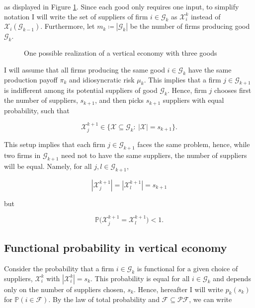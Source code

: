 \documentclass[american, abstract=on]{scrartcl}
\newcommand{\inputTikZ}[2]{%
      \scalebox{#1}{}  
    }
\newcommand{\F}{\mathcal{F}}
\newcommand{\X}{\mathcal{X}}
\newcommand{\G}{\mathcal{G}}
\newcommand{\PF}{\mathcal{P} \F}
\renewcommand{\P}{\mathbb{P}}
\newcommand{\abs}[1]{\left\lvert#1\right\rvert}
\begin{document}
as displayed in Figure \ref{fig:vertical}. Since each good only requires one input, to simplify notation I will write the set of suppliers of firm $i \in \G_k$ as $\X^k_i$ instead of $\X_i(\G_{k - 1})$. Furthermore, let $m_k \coloneqq \abs{\G_k}$ be the number of firms producing good $\G_k$.

\begin{figure}[H]
  \centering
  \inputTikZ{0.7}{../diagrams/vertical-economy.tikz} 
  \caption{One possible realization of a vertical economy with three goods}
  \label{fig:vertical}
\end{figure}



I will assume that all firms producing the same good $i \in \G_k$ have the same production payoff $\pi_k$ and idiosyncratic risk $\mu_k$. This implies that a firm $j \in \G_{k+1}$ is indifferent among its potential suppliers of good $\G_k$. Hence, firm $j$ chooses first the number of suppliers, $s_{k+1}$, and then picks $s_{k+1}$ suppliers with equal probability, such that

\begin{equation}
  \X^{k+1}_j \in \{ \X \subseteq \G_{k}: \ \abs{\X} = s_{k+1} \}.
\end{equation}


This setup implies that each firm $j \in \G_{k+1}$ faces the same problem, hence, while two firms in $\G_{k+1}$ need not to have the same suppliers, the number of suppliers will be equal. Namely, for all $j, l \in \G_{k+1}$,

\begin{equation}
  \abs{\X^{k+1}_j} = \abs{\X^{k+1}_l} = s_{k+1}
\end{equation}

but

\begin{equation}
  \P\Big(\X^{k+1}_j = \X^{k+1}_l\Big) < 1.
\end{equation}

\subsection{Functional probability in vertical economy}

Consider the probability that a firm $i \in \G_k$ is functional for a given choice of suppliers, $\X^k_i$ with $\abs{\X^k_i} = s_k$. This probability is equal for all $i \in \G_k$ and depends only on the number of suppliers chosen, $s_k$. Hence, hereafter I will write $p_k(s_k)$ for $\P(i \in \F)$. By the law of total probability and $\F \subseteq \PF$, we can write
\end{document}
